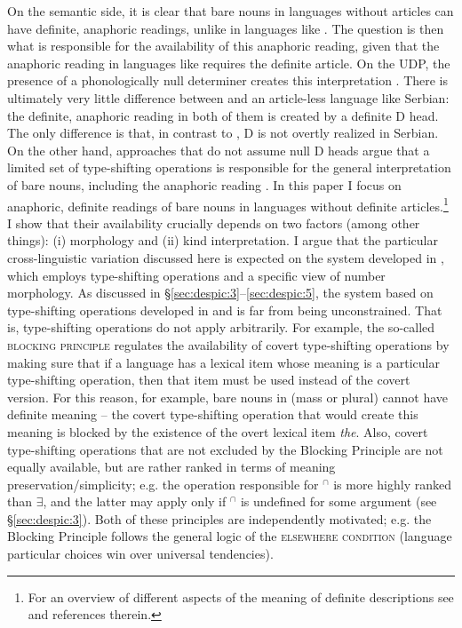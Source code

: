 \documentclass[output=paper,
modfonts
]{langscibook}
\begin{document}
	On the semantic side, it is clear that bare nouns in languages without articles can have definite, anaphoric readings, unlike in languages like . The question is then what is responsible for the availability of this anaphoric reading, given that the anaphoric reading in languages like  requires the definite article. On the UDP, the presence of a phonologically null determiner creates this interpretation \citep[e.g.][]{Longobardi1994}. There is ultimately very little difference between  and an article-less language like Serbian: the definite, anaphoric reading in both of them is created by a definite D head. The only difference is that, in contrast to , D is not overtly realized in Serbian. On the other hand, approaches that do not assume null D heads argue that a limited set of type-shifting operations is responsible for the  general interpretation of bare nouns, including the anaphoric reading \citep[e.g.][]{Chierchia1998,Dayal2004}.  In this paper I focus on anaphoric, definite readings of bare nouns in languages without definite articles.\footnote{For an overview of different aspects of the meaning of definite descriptions see \citet{Schwarz2009} and references
		therein.}  I show that their availability crucially depends on two factors (among other things): (i)  morphology and (ii) kind interpretation. I argue that the particular cross-linguistic variation discussed here is expected on the system developed in \citet{Dayal2004}, which employs type-shifting operations and a specific view of number morphology. 
	As discussed in \S\ref{sec:despic:3}--\ref{sec:despic:5}, the system based on type-shifting operations developed in \citep{Chierchia1998} and \citep{Dayal2004} is far from being unconstrained. That is, type-shifting operations do not apply arbitrarily. For example, the so-called \textsc{blocking principle} regulates the availability of covert type-shifting operations by making sure that if a language has a lexical item whose meaning is a particular type-shifting operation, then that item must be used instead of the covert version. For this reason, for example, bare nouns in  (mass or plural) cannot have definite meaning -- the covert type-shifting operation that would create this meaning is blocked by the existence of the overt lexical item \textit{the}. Also, covert type-shifting operations that are not excluded by the Blocking Principle are not equally available, but are rather ranked in terms of meaning preservation/simplicity; e.g. the operation responsible for  $^\cap$ is more highly ranked than $\exists$, and the latter may apply only if $^\cap$ is undefined for some argument (see \S\ref{sec:despic:3}). Both of these principles are independently motivated; e.g. the Blocking Principle follows the general logic of the \textsc{elsewhere condition} (language particular choices win over universal tendencies).  
	
\end{document}
